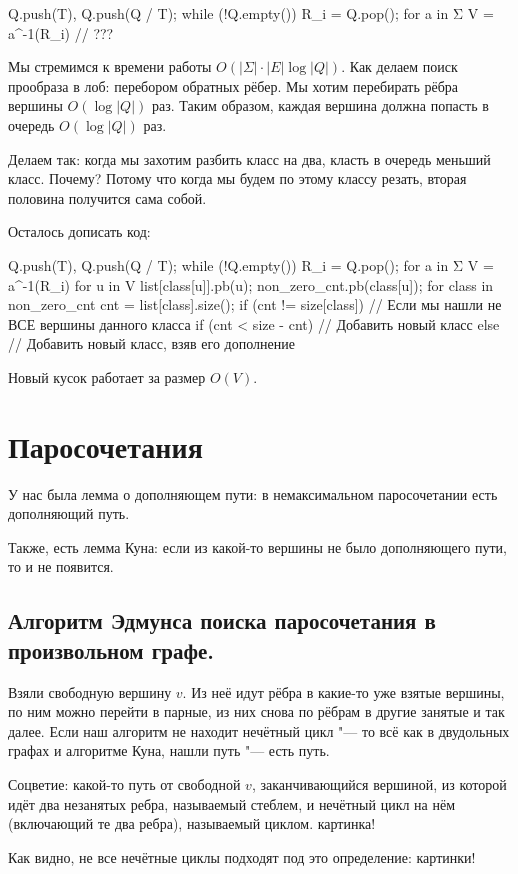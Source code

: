 \begin{abstractcode}
Q.push(T), Q.push(Q / T);
while (!Q.empty()) {
	R_i = Q.pop();
	for a in Σ {
		V = a^{-1}(R_i)
		// ???
	}
}
\end{abstractcode}
Мы стремимся к времени работы $O(|Σ| \cdot |E| \log |Q|)$.
Как делаем поиск прообраза в лоб: перебором обратных рёбер.
Мы хотим перебирать рёбра вершины $O(\log |Q|)$ раз.
Таким образом, каждая вершина должна попасть в очередь
$O(\log |Q|)$ раз.

Делаем так: когда мы захотим разбить класс на два, класть в очередь меньший класс.
Почему? Потому что когда мы будем по этому классу резать, вторая половина получится сама собой.

Осталось дописать код:
\begin{abstractcode}
Q.push(T), Q.push(Q / T);
while (!Q.empty()) {
	R_i = Q.pop();
	for a in Σ {
		V = a^{-1}(R_i)
		for u in V {
			list[class[u]].pb(u);
			non_zero_cnt.pb(class[u]);
		}
		for class in non_zero_cnt {
			cnt = list[class].size();
			if (cnt != size[class]) {
				// Если мы нашли не ВСЕ вершины данного класса
				if (cnt < size - cnt) {
					// Добавить новый класс
				} else {
					// Добавить новый класс, взяв его дополнение
				}
			}
		}
	}
}
\end{abstractcode}
Новый кусок работает за размер $O(V)$.

\chapter{Паросочетания}

У нас была лемма о дополняющем пути: в немаксимальном паросочетании есть дополняющий путь.

Также, есть лемма Куна: если из какой-то вершины не было дополняющего пути, то и не появится.

\section{Алгоритм Эдмунса поиска паросочетания в произвольном графе.}

Взяли свободную вершину $v$.
Из неё идут рёбра в какие-то уже взятые вершины, по ним можно перейти в парные, из них снова по рёбрам в другие занятые и так далее.
Если наш алгоритм не находит нечётный цикл "--- то всё как в двудольных графах и алгоритме Куна, нашли путь "--- есть путь.
\begin{Def}
	Соцветие: какой-то путь от свободной $v$, заканчивающийся вершиной,
	из которой идёт два незанятых ребра, называемый стеблем,
	и нечётный цикл на нём (включающий те два ребра), называемый циклом. \TODO картинка!
\end{Def}
Как видно, не все нечётные циклы подходят под это определение: \TODO картинки!

